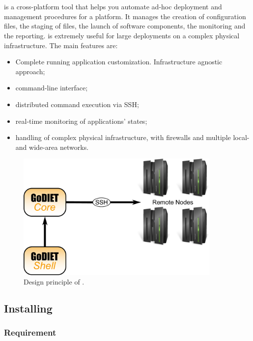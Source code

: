 \section{\godiet}
\label{sec:deployGoDIET}

\godiet is a cross-platform tool that helps you automate ad-hoc deployment and
management procedures for a \diet platform. It manages
the creation of configuration files, the staging of files, the launch of software components, the monitoring and the reporting. \godiet is extremely useful for large deployments on a complex physical infrastructure. The main features are:
\begin{itemize}
  \item \bla Complete running application customization. Infrastructure agnostic approach;
  \item command-line interface;
  \item distributed command execution via SSH;
  \item real-time monitoring of applications' states;
  \item handling of complex physical infrastructure, with firewalls and multiple local- and wide-area networks.
\end{itemize}
\begin{figure}[h]
  \centering
  \includegraphics[width=10cm]{fig/schemaPhilippe}
  \caption{Design principle of \godiet.\label{fig:GODIETDesign}}
\end{figure}


\subsection{Installing \godiet}

\bla\subsubsection{Requirement}

